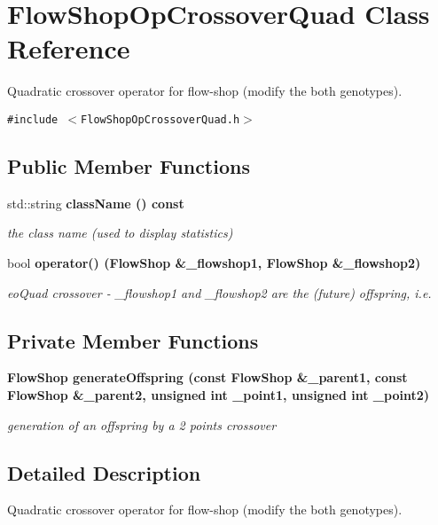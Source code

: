 \section{Flow\-Shop\-Op\-Crossover\-Quad Class Reference}
\label{classFlowShopOpCrossoverQuad}
Quadratic crossover operator for flow-shop (modify the both genotypes).  


{\tt \#include $<$Flow\-Shop\-Op\-Crossover\-Quad.h$>$}

\subsection*{Public Member Functions}
\begin{CompactItemize}
\item 
std::string \bf{class\-Name} () const \label{classFlowShopOpCrossoverQuad_60ac69b87970b7000980f65aa6ead44a}

\begin{CompactList}\small\item\em the class name (used to display statistics) \item\end{CompactList}\item 
bool \bf{operator()} (\bf{Flow\-Shop} \&\_\-flowshop1, \bf{Flow\-Shop} \&\_\-flowshop2)
\begin{CompactList}\small\item\em eo\-Quad crossover - \_\-flowshop1 and \_\-flowshop2 are the (future) offspring, i.e. \item\end{CompactList}\end{CompactItemize}
\subsection*{Private Member Functions}
\begin{CompactItemize}
\item 
\bf{Flow\-Shop} \bf{generate\-Offspring} (const \bf{Flow\-Shop} \&\_\-parent1, const \bf{Flow\-Shop} \&\_\-parent2, unsigned int \_\-point1, unsigned int \_\-point2)
\begin{CompactList}\small\item\em generation of an offspring by a 2 points crossover \item\end{CompactList}\end{CompactItemize}


\subsection{Detailed Description}
Quadratic crossover operator for flow-shop (modify the both genotypes). 




